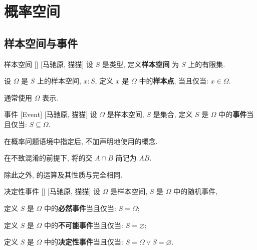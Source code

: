 \documentclass[UTF8]{ctexart}
\begin{document}
\tableofcontents
\newpage

\section{概率空间}

    \subsection{样本空间与事件}

        \begin{dfn}
            {样本空间}
            []
            [马驰原, 猫猫]
            设 \(S\) 是类型, 定义\textbf{样本空间} 为 \(S\) 上的有限集. 

            设 \(\Omega\) 是 \(S\) 上的样本空间, \(x:S\), 定义 \(x\) 是 \(\Omega\) 中的\textbf{样本点}, 当且仅当: \(x\in\Omega\). 
        \end{dfn}

        \begin{rmk}
            [猫猫]
            通常使用 \(\Omega\) 表示. 
        \end{rmk}

        \begin{dfn}
            [Event]
            {事件}
            [Event]
            [马驰原, 猫猫]
            设 \(\Omega\) 是样本空间, \(S\) 是集合, 定义 \(S\) 是 \(\Omega\) 中的\textbf{事件}当且仅当: \(S\subseteq\Omega\). 
        \end{dfn}

        \begin{rmk}
            [猫猫]
            在概率问题语境中指定 后, 不加声明地使用 的概念. 
        \end{rmk}

        \begin{rmk}
            [猫猫]
            在不致混淆的前提下, 将 的交 \(A\cap B\) 简记为 \(AB\). 

            除此之外,  的运算及其性质与 完全相同. 
        \end{rmk}

        \begin{dfn}
            []
            {决定性事件}
            []
            [马驰原, 猫猫]
            设 \(\Omega\) 是样本空间, \(S\) 是 \(\Omega\) 中的随机事件, 

            定义 \(S\) 是 \(\Omega\) 中的\textbf{必然事件}当且仅当: \(S=\Omega\); 

            定义 \(S\) 是 \(\Omega\) 中的\textbf{不可能事件}当且仅当: \(S=\varnothing\); 

            定义 \(S\) 是 \(\Omega\) 中的\textbf{决定性事件}当且仅当: \(S=\Omega\lor S=\varnothing\). 
        \end{dfn}
\end{document}
